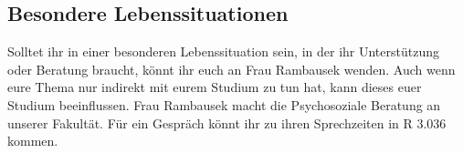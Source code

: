 \subsection{Besondere Lebenssituationen}
Solltet ihr in einer besonderen Lebenssituation sein, in der ihr Unterstützung oder Beratung braucht,
könnt ihr euch an Frau Rambausek wenden. Auch wenn eure Thema nur indirekt mit eurem Studium zu tun hat, kann dieses euer Studium beeinflussen.
 Frau Rambausek macht die Psychosoziale Beratung an unserer Fakultät.
 Für ein Gespräch könnt ihr zu ihren Sprechzeiten in R 3.036 kommen.